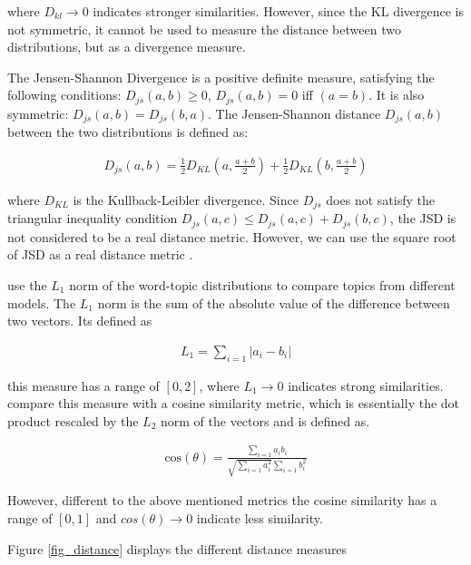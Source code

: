 \documentclass[12pt,a4paper,notitlepage]{article}
\begin{document}
where $D_{kl} \to 0$ indicates stronger similarities. However, since the KL divergence is not symmetric, it cannot be used to measure the distance between two distributions, but as a divergence measure.

The Jensen-Shannon Divergence is a positive definite measure, satisfying the following conditions: $D_{js}(a,b) \geq 0$, $D_{js}(a,b)=0$ iff $(a=b)$. It is also symmetric: $D_{js}(a,b)=D_{js}(b,a)$. The Jensen-Shannon distance $D_{js}(a,b)$ between the two distributions is defined as:

\begin{align*}
	D_{js}(a,b)=\frac{1}{2}D_{KL}(a,\frac{a+b}{2})+\frac{1}{2}D_{KL}(b,\frac{a+b}{2})
\end{align*}

where $D_{KL}$ is the Kullback-Leibler divergence. Since $D_{js}$ does not satisfy the triangular inequality condition $D_{js}(a,c)\leq D_{js}(a,c)+D_{js}(b,c)$, the JSD is not considered to be a real distance metric. However, we can use the square root of JSD as a real distance metric \citep{endres_new_2003}.

\citet{roberts_navigating_2016} use the $L_1$ norm of the word-topic distributions to compare topics from different models. The $L_1$ norm is the sum of the absolute value of the difference between two vectors. Its defined as

\begin{align*}
	L_1=\sum_{i=1} |a_i-b_i|
\end{align*}

this measure has a range of $[0,2]$, where $ L_1 \to 0$ indicates strong similarities. \citet{roberts_navigating_2016} compare this measure with a cosine similarity metric, which is essentially the dot product rescaled by the $L_2$ norm of the vectors and is defined as.

\begin{align*}
	\text{cos}(\theta)=\frac{\sum_{i=1}a_i b_i}{\sqrt{\sum_{i=1}a_i^2}\sum_{i=1}b_i^2}
\end{align*}

However, different to the above mentioned metrics the cosine similarity has a range of $[0,1]$ and $cos(\theta) \to 0$ indicate less similarity.

Figure \ref{fig_distance} displays the different distance measures 
\end{document}
